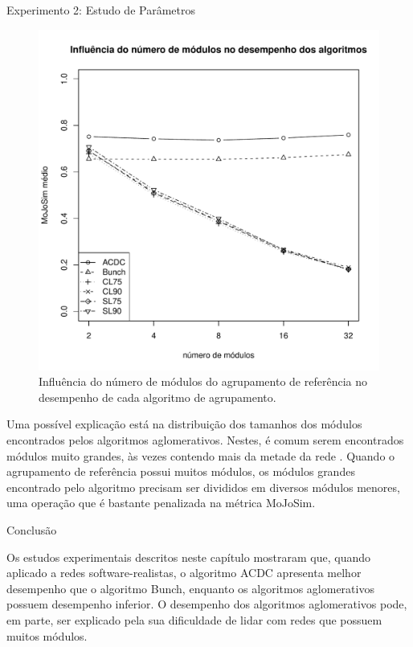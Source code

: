 \begin{section}{Experimento 2: Estudo de Parâmetros}
\begin{figure}[htbp]
	\centering
		\includegraphics[scale=0.5]{figuras/mojosim-vs-modules}
	\caption{Influência do número de módulos do agrupamento de referência no desempenho de cada algoritmo de agrupamento.}
	\label{fig:mojosim-vs-modules}
\end{figure}

Uma possível explicação está na distribuição dos tamanhos dos módulos encontrados pelos algoritmos aglomerativos. Nestes, é comum serem encontrados módulos muito grandes, às vezes contendo mais da metade da rede \cite{Wu2005}. Quando o agrupamento de referência possui muitos módulos, os módulos grandes encontrado pelo algoritmo precisam ser divididos em diversos módulos menores, uma operação que é bastante penalizada na métrica MoJoSim.


\end{section}

\begin{section}{Conclusão}

Os estudos experimentais descritos neste capítulo mostraram que, quando aplicado a redes software-realistas, o algoritmo ACDC apresenta melhor desempenho que o algoritmo Bunch, enquanto os algoritmos aglomerativos possuem desempenho inferior. O desempenho dos algoritmos aglomerativos pode, em parte, ser explicado pela sua dificuldade de lidar com redes que possuem muitos módulos. 

\end{section}
